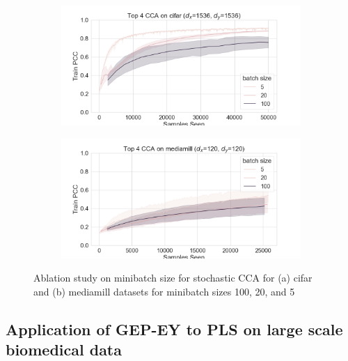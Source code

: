 \begin{figure}[h]
    \centering
    \begin{subfigure}[b]{0.49\textwidth}
        \centering
        \includegraphics[width=\textwidth]{figures/gradient_descent/CCA/cifar_minibatch_size_ablation.png}
        \caption{}
        \label{fig:cifar_minibatch_ablation}
    \end{subfigure}
    \begin{subfigure}[b]{0.49\textwidth}
        \centering
        \includegraphics[width=\textwidth]{figures/gradient_descent/CCA/mediamill_minibatch_size_ablation.png}
        \caption{}
        \label{fig:mediamill_minibatch_ablation}
    \end{subfigure}
    \caption{Ablation study on minibatch size for stochastic CCA for (a) cifar and (b) mediamill datasets for minibatch sizes 100, 20, and 5}
    \label{fig:minibatch size ablation}
\end{figure}



\subsection{Application of GEP-EY to PLS on large scale biomedical data}

